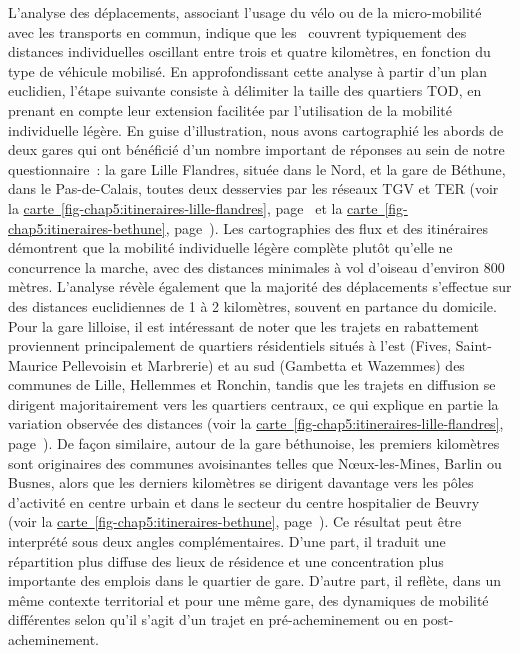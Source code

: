 \begin{refsegment}
L'analyse des déplacements, associant l'usage du vélo ou de la micro-mobilité avec les transports en commun, indique que les ~couvrent typiquement des distances individuelles oscillant entre trois et quatre kilomètres, en fonction du type de véhicule mobilisé. En approfondissant cette analyse à partir d'un plan euclidien, l'étape suivante consiste à délimiter la taille des quartiers \acrshort{TOD}, en prenant en compte leur extension facilitée par l'utilisation de la mobilité individuelle légère. En guise d'illustration, nous avons cartographié les abords de deux gares qui ont bénéficié d'un nombre important de réponses au sein de notre questionnaire~: la gare Lille Flandres, située dans le Nord, et la gare de Béthune, dans le Pas-de-Calais, toutes deux desservies par les réseaux \acrshort{TGV} et \acrshort{TER} (voir la \hyperref[fig-chap5:itineraires-lille-flandres]{carte~\ref{fig-chap5:itineraires-lille-flandres}}, page~\pageref{fig-chap5:itineraires-lille-flandres} et la \hyperref[fig-chap5:itineraires-bethune]{carte~\ref{fig-chap5:itineraires-bethune}}, page~\pageref{fig-chap5:itineraires-bethune}). Les cartographies des flux et des itinéraires démontrent que la mobilité individuelle légère complète plutôt qu'elle ne concurrence la marche, avec des distances minimales à vol d'oiseau d'environ 800 mètres. L'analyse révèle également que la majorité des déplacements s'effectue sur des distances euclidiennes de 1 à 2 kilomètres, souvent en partance du domicile. Pour la gare lilloise, il est intéressant de noter que les trajets en rabattement proviennent principalement de quartiers résidentiels situés à l'est (Fives, Saint-Maurice Pellevoisin et Marbrerie) et au sud (Gambetta et Wazemmes) des communes de Lille, Hellemmes et Ronchin, tandis que les trajets en diffusion se dirigent majoritairement vers les quartiers centraux, ce qui explique en partie la variation observée des distances (voir la \hyperref[fig-chap5:itineraires-lille-flandres]{carte~\ref{fig-chap5:itineraires-lille-flandres}}, page~\pageref{fig-chap5:itineraires-lille-flandres}). De façon similaire, autour de la gare béthunoise, les premiers kilomètres sont originaires des communes avoisinantes telles que Nœux-les-Mines, Barlin ou Busnes, alors que les derniers kilomètres se dirigent davantage vers les pôles d'activité en centre urbain et dans le secteur du centre hospitalier de Beuvry (voir la \hyperref[fig-chap5:itineraires-bethune]{carte~\ref{fig-chap5:itineraires-bethune}}, page~\pageref{fig-chap5:itineraires-bethune}). Ce résultat peut être interprété sous deux angles complémentaires. D'une part, il traduit une répartition plus diffuse des lieux de résidence et une concentration plus importante des emplois dans le quartier de gare. D'autre part, il reflète, dans un même contexte territorial et pour une même gare, des dynamiques de mobilité différentes selon qu'il s'agit d'un trajet en pré-acheminement ou en post-acheminement.%


\end{refsegment}
